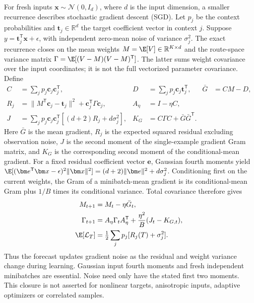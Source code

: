 For fresh inputs $\bm x\sim\mathcal N(0,I_d)$, where $d$ is the input
dimension, a smaller recurrence describes stochastic gradient descent (SGD).
Let $p_j$ be the context probabilities and $\bm t_j\in\mathbb R^d$ the
target coefficient vector in context $j$. Suppose
$y=\bm t_j^{\mathsf T}\bm x+\epsilon$, with independent zero-mean noise
of variance $\sigma_j^2$. The exact recurrence closes on the mean weights
$M=\E[V]\in\mathbb R^{K\times d}$ and the route-space variance matrix
$\Gamma=\E[(V-M)(V-M)^{\mathsf T}]$. The latter sums weight covariance
over the input coordinates; it is not the full vectorized parameter
covariance. Define
\begin{align}
 C&=\sum_jp_j\bm c_j\bm c_j^{\mathsf T},&
 D&=\sum_jp_j\bm c_j\bm t_j^{\mathsf T},&
 \bar G&=CM-D,\\
 R_j&=\|M^{\mathsf T}\bm c_j-\bm t_j\|^2+
                    \bm c_j^{\mathsf T}\Gamma\bm c_j,&
 A_\eta&=I-\eta C,\\
 J&=\sum_jp_j\bm c_j\bm c_j^{\mathsf T}
                  [(d+2)R_j+d\sigma_j^2],&
 K_G&=C\Gamma C+\bar G\bar G^{\mathsf T}.
\end{align}
Here $\bar G$ is the mean gradient, $R_j$ is the expected squared residual
excluding observation noise, $J$ is the second moment of the single-example
gradient Gram matrix, and $K_G$ is the corresponding second moment of the
conditional-mean gradient. For a fixed residual coefficient vector
$\bm e$, Gaussian fourth moments yield
$\E[(\bm e^{\mathsf T}\bm x-\epsilon)^2\|\bm x\|^2]
=(d+2)\|\bm e\|^2+d\sigma_j^2$. Conditioning first on the current
weights, the Gram of a minibatch-mean gradient is its conditional-mean Gram
plus $1/B$ times its conditional variance. Total covariance therefore gives
\begin{align}
 M_{t+1}&=M_t-\eta\bar G_t,\\
 \Gamma_{t+1}&=A_\eta\Gamma_t A_\eta^{\mathsf T}
                      +\frac{\eta^2}{B}(J_t-K_{G,t}),
 \label{eq:s_fresh_sgd_moments}\\
 \E[\mathcal L_T]&=\tfrac12\sum_jp_j[R_j(T)+\sigma_j^2].
\end{align}
Thus the forecast updates gradient noise as the residual and weight
variance change during learning. Gaussian input fourth moments and fresh independent
minibatches are essential. Noise need only have the stated first two moments.
This closure is not asserted for nonlinear targets, anisotropic inputs,
adaptive optimizers or correlated samples.

